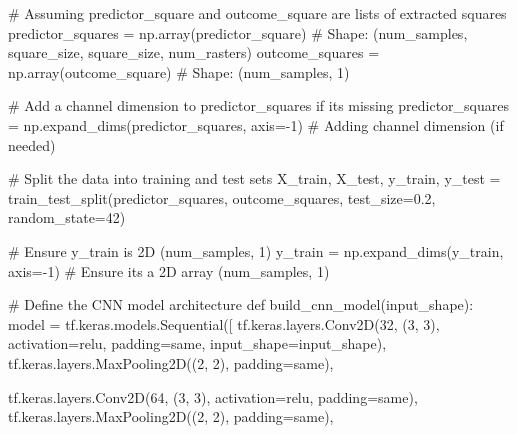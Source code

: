 \documentclass[
  letterpaper,
]{article}
\newenvironment{Shaded}{\begin{snugshade}}{\end{snugshade}}
\newcommand{\CommentTok}[1]{\textcolor[rgb]{0.37,0.37,0.37}{#1}}
\newcommand{\DecValTok}[1]{\textcolor[rgb]{0.68,0.00,0.00}{#1}}
\newcommand{\FloatTok}[1]{\textcolor[rgb]{0.68,0.00,0.00}{#1}}
\newcommand{\KeywordTok}[1]{\textcolor[rgb]{0.00,0.23,0.31}{#1}}
\newcommand{\NormalTok}[1]{\textcolor[rgb]{0.00,0.23,0.31}{#1}}
\newcommand{\OperatorTok}[1]{\textcolor[rgb]{0.37,0.37,0.37}{#1}}
\newcommand{\StringTok}[1]{\textcolor[rgb]{0.13,0.47,0.30}{#1}}
\begin{document}
\begin{Shaded}
\begin{Highlighting}[]
\CommentTok{\# Assuming \textasciigrave{}predictor\_square\textasciigrave{} and \textasciigrave{}outcome\_square\textasciigrave{} are lists of extracted squares}
\NormalTok{predictor\_squares }\OperatorTok{=}\NormalTok{ np.array(predictor\_square)  }\CommentTok{\# Shape: (num\_samples, square\_size, square\_size, num\_rasters)}
\NormalTok{outcome\_squares }\OperatorTok{=}\NormalTok{ np.array(outcome\_square)      }\CommentTok{\# Shape: (num\_samples, 1)}

\CommentTok{\# Add a channel dimension to predictor\_squares if it\textquotesingle{}s missing}
\NormalTok{predictor\_squares }\OperatorTok{=}\NormalTok{ np.expand\_dims(predictor\_squares, axis}\OperatorTok{={-}}\DecValTok{1}\NormalTok{)  }\CommentTok{\# Adding channel dimension (if needed)}

\CommentTok{\# Split the data into training and test sets}
\NormalTok{X\_train, X\_test, y\_train, y\_test }\OperatorTok{=}\NormalTok{ train\_test\_split(predictor\_squares, outcome\_squares, test\_size}\OperatorTok{=}\FloatTok{0.2}\NormalTok{, random\_state}\OperatorTok{=}\DecValTok{42}\NormalTok{)}

\CommentTok{\# Ensure y\_train is 2D (num\_samples, 1)}
\NormalTok{y\_train }\OperatorTok{=}\NormalTok{ np.expand\_dims(y\_train, axis}\OperatorTok{={-}}\DecValTok{1}\NormalTok{)  }\CommentTok{\# Ensure it\textquotesingle{}s a 2D array (num\_samples, 1)}

\CommentTok{\# Define the CNN model architecture}
\KeywordTok{def}\NormalTok{ build\_cnn\_model(input\_shape):}
\NormalTok{    model }\OperatorTok{=}\NormalTok{ tf.keras.models.Sequential([}
\NormalTok{        tf.keras.layers.Conv2D(}\DecValTok{32}\NormalTok{, (}\DecValTok{3}\NormalTok{, }\DecValTok{3}\NormalTok{), activation}\OperatorTok{=}\StringTok{\textquotesingle{}relu\textquotesingle{}}\NormalTok{, padding}\OperatorTok{=}\StringTok{\textquotesingle{}same\textquotesingle{}}\NormalTok{, input\_shape}\OperatorTok{=}\NormalTok{input\_shape),}
\NormalTok{        tf.keras.layers.MaxPooling2D((}\DecValTok{2}\NormalTok{, }\DecValTok{2}\NormalTok{), padding}\OperatorTok{=}\StringTok{\textquotesingle{}same\textquotesingle{}}\NormalTok{),}
        
\NormalTok{        tf.keras.layers.Conv2D(}\DecValTok{64}\NormalTok{, (}\DecValTok{3}\NormalTok{, }\DecValTok{3}\NormalTok{), activation}\OperatorTok{=}\StringTok{\textquotesingle{}relu\textquotesingle{}}\NormalTok{, padding}\OperatorTok{=}\StringTok{\textquotesingle{}same\textquotesingle{}}\NormalTok{),}
\NormalTok{        tf.keras.layers.MaxPooling2D((}\DecValTok{2}\NormalTok{, }\DecValTok{2}\NormalTok{), padding}\OperatorTok{=}\StringTok{\textquotesingle{}same\textquotesingle{}}\NormalTok{),}
        

\end{Highlighting}
\end{Shaded}
\end{document}
